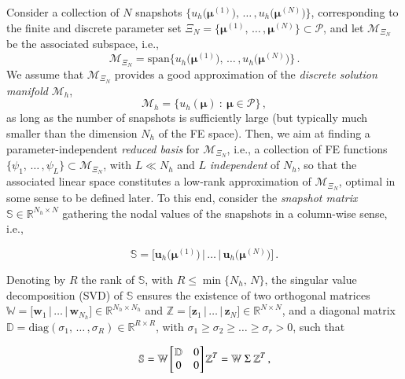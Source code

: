 \documentclass[longtitle]{elsarticle}
\numberwithin{equation}{section}
\theoremstyle{theorem}
\theoremstyle{definition}
\theoremstyle{remark}
\theoremstyle{proposition}
\numberwithin{figure}{section}
\newcommand{\bg}[1]{\boldsymbol{#1}}
\begin{document}
		Consider a collection of $N$ snapshots $\big\lbrace u_h \big( \bg{\mu}^{(1)} \big), \, \ldots \, , u_h \big( \bg{\mu}^{(N)} \big) \big\rbrace$, corresponding to the finite and discrete parameter set $\Xi_N = \big\lbrace \bg{\mu}^{(1)}, \, \ldots \, , \bg{\mu}^{(N)} \big\rbrace \subset \mathcal{P}$, and let $\mathcal{M}_{\Xi_N}$ be the associated subspace, i.e., \[ \mathcal{M}_{\Xi_N} = \text{span} \big\lbrace u_h \big( \bg{\mu}^{(1)} \big), \, \ldots \, , u_h \big( \bg{\mu}^{(N)} \big) \big\rbrace \, . \] We assume that $\mathcal{M}_{\Xi_N}$ provides a good approximation of the \emph{discrete solution manifold} $\mathcal{M}_h$, \[ \mathcal{M}_h = \big\lbrace u_h(\bg{\mu}) ~ : ~ \bg{\mu} \in \mathcal{P} \big\rbrace \, , \] as long as the number of snapshots is sufficiently large (but typically much smaller than the dimension ${N_h}$ of the FE space). Then, we aim at finding a parameter-independent \emph{reduced basis} for $\mathcal{M}_{\Xi_N}$, i.e., a collection of FE functions $\big\lbrace \psi_1, \, \ldots \, , \psi_L \big\rbrace \subset \mathcal{M}_{\Xi_N}$, with $L \ll {N_h}$ and $L$ \emph{independent} of $N_h$, so that the associated linear space constitutes a low-rank approximation of $\mathcal{M}_{\Xi_N}$, optimal in some sense to be defined later. To this end, consider the \emph{snapshot matrix} $\mathbb{S} \in \mathbb{R}^{{N_h} \times N}$ gathering the nodal values of the snapshots in a column-wise sense, i.e.,
		\begin{linenomath}\begin{equation*}
			\mathbb{S} = \big[ \mathbf{u}_h \big( \bg{\mu}^{(1)} \big) \, \big| \, \ldots \, \big| \, \mathbf{u}_h \big( \bg{\mu}^{(N)} \big) \big] \, .
		\end{equation*}\end{linenomath}
		Denoting by $R$ the rank of $\mathbb{S}$, with $R \leq \min \big\lbrace{ {N_h}, \, N \big\rbrace}$, the singular value decomposition (SVD) of $\mathbb{S}$ ensures the existence of two orthogonal matrices $\mathbb{W} = \big[ \mathbf{w}_1 \, \big| \, \ldots \, \big| \, \mathbf{w}_{N_h} \big] \in \mathbb{R}^{{N_h} \times {N_h}}$ and $\mathbb{Z} = \big[ \mathbf{z}_1 \, \big| \, \ldots \, \big| \, \mathbf{z}_N \big] \in \mathbb{R}^{N \times N}$, and a diagonal matrix $\mathbb{D} = \text{diag}(\sigma_1, \, \ldots \, , \sigma_R) \in \mathbb{R}^{R \times R}$, with $\sigma_1 \geq \sigma_2 \geq \ldots \geq \sigma_r > 0$, such that
		\begin{linenomath}\begin{equation*}
			\label{eq:svd}
			\mathbb{S} = \mathbb{W} 
			\begin{bmatrix}
			\hspace*{-0.15cm}
			\begin{array}{cc}
				\mathbb{D} & 0 \\
				0 & 0
			\end{array} 
			\hspace*{-0.15cm}
			\end{bmatrix}
			\mathbb{Z}^T = \mathbb{W} ~ \Sigma ~ \mathbb{Z}^T \, ,
		\end{equation*}\end{linenomath}
\end{document}
